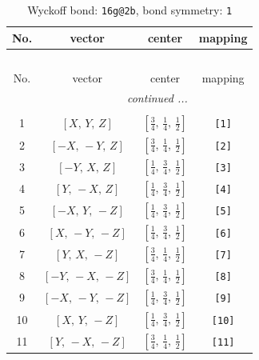 \documentclass[fleqn,8pt]{jsarticle}
\begin{document}
\begin{longtable}{cccc}
\caption{Wyckoff bond: {\tt 16g@2b}, bond symmetry: {\tt 1}}
 \\
 \hline \hline
No. & vector & center & mapping \\ \hline \endfirsthead

\multicolumn{3}{l}{\tablename\ \thetable{}} \\
 \hline \hline
No. & vector & center & mapping \\ \hline \endhead

 \hline \hline
\multicolumn{3}{r}{\footnotesize\it continued ...} \\ \endfoot

 \hline \hline
\multicolumn{3}{r}{} \\ \endlastfoot

1 & $\left[ X,\, Y,\, Z \right]$ & $\left[ \frac{3}{4},\, \frac{1}{4},\, \frac{1}{2} \right]$ & {\tt [1]} \\ \hline
2 & $\left[ - X,\, - Y,\, Z \right]$ & $\left[ \frac{3}{4},\, \frac{1}{4},\, \frac{1}{2} \right]$ & {\tt [2]} \\ \hline
3 & $\left[ - Y,\, X,\, Z \right]$ & $\left[ \frac{1}{4},\, \frac{3}{4},\, \frac{1}{2} \right]$ & {\tt [3]} \\ \hline
4 & $\left[ Y,\, - X,\, Z \right]$ & $\left[ \frac{1}{4},\, \frac{3}{4},\, \frac{1}{2} \right]$ & {\tt [4]} \\ \hline
5 & $\left[ - X,\, Y,\, - Z \right]$ & $\left[ \frac{1}{4},\, \frac{3}{4},\, \frac{1}{2} \right]$ & {\tt [5]} \\ \hline
6 & $\left[ X,\, - Y,\, - Z \right]$ & $\left[ \frac{1}{4},\, \frac{3}{4},\, \frac{1}{2} \right]$ & {\tt [6]} \\ \hline
7 & $\left[ Y,\, X,\, - Z \right]$ & $\left[ \frac{3}{4},\, \frac{1}{4},\, \frac{1}{2} \right]$ & {\tt [7]} \\ \hline
8 & $\left[ - Y,\, - X,\, - Z \right]$ & $\left[ \frac{3}{4},\, \frac{1}{4},\, \frac{1}{2} \right]$ & {\tt [8]} \\ \hline
9 & $\left[ - X,\, - Y,\, - Z \right]$ & $\left[ \frac{1}{4},\, \frac{3}{4},\, \frac{1}{2} \right]$ & {\tt [9]} \\ \hline
10 & $\left[ X,\, Y,\, - Z \right]$ & $\left[ \frac{1}{4},\, \frac{3}{4},\, \frac{1}{2} \right]$ & {\tt [10]} \\ \hline
11 & $\left[ Y,\, - X,\, - Z \right]$ & $\left[ \frac{3}{4},\, \frac{1}{4},\, \frac{1}{2} \right]$ & {\tt [11]} \\ \hline

\end{longtable}
\end{document}

